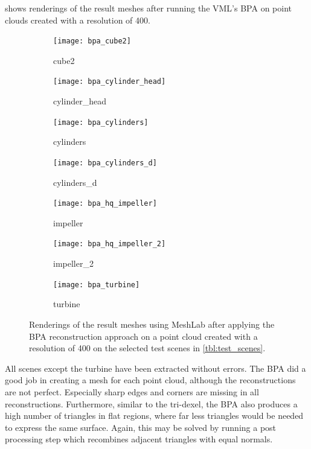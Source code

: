  shows renderings of the result meshes after running the VML's BPA on point clouds created with a resolution of 400.
%
\begin{figure}
	\centering
	\begin{subfigure}[b]{0.34\textwidth}
		\centering
		\texttt{[image: bpa\_cube2]}
		\caption{cube2}
		\label{fig:bpa_cube2}
	\end{subfigure}
	\hspace{1cm}
	\begin{subfigure}[b]{0.34\textwidth}
		\centering
		\texttt{[image: bpa\_cylinder\_head]}
		\caption{cylinder\_head}
		\label{fig:bpa_cylinder_head}
	\end{subfigure}
	\begin{subfigure}[b]{0.34\textwidth}
		\centering
		\texttt{[image: bpa\_cylinders]}
		\caption{cylinders}
		\label{fig:bpa_cylinders}
	\end{subfigure}
	\hspace{1cm}
	\begin{subfigure}[b]{0.34\textwidth}
		\centering
		\texttt{[image: bpa\_cylinders\_d]}
		\caption{cylinders\_d}
		\label{fig:bpa_cylinders_d}
	\end{subfigure}
	\begin{subfigure}[b]{0.34\textwidth}
		\centering
		\texttt{[image: bpa\_hq\_impeller]}
		\caption{impeller}
		\label{fig:bpa_hq_impeller}
	\end{subfigure}
	\hspace{1cm}
	\begin{subfigure}[b]{0.34\textwidth}
		\centering
		\texttt{[image: bpa\_hq\_impeller\_2]}
		\caption{impeller\_2}
		\label{fig:bpa_hq_impeller_2}
	\end{subfigure}
	\begin{subfigure}[b]{0.33\textwidth}
		\centering
		\texttt{[image: bpa\_turbine]}
		\caption{turbine}
		\label{fig:bpa_turbine}
	\end{subfigure}
	\caption{
		Renderings of the result meshes using MeshLab after applying the BPA reconstruction approach on a point cloud created with a resolution of 400 on the selected test scenes in \cref{tbl:test_scenes}.
	}
	\label{fig:bpa_results}
\end{figure}
%
All scenes except the turbine have been extracted without errors.
The BPA did a good job in creating a mesh for each point cloud, although the reconstructions are not perfect.
Especially sharp edges and corners are missing in all reconstructions.
Furthermore, similar to the tri-dexel, the BPA also produces a high number of triangles in flat regions, where far less triangles would be needed to express the same surface.
Again, this may be solved by running a post processing step which recombines adjacent triangles with equal normals.

